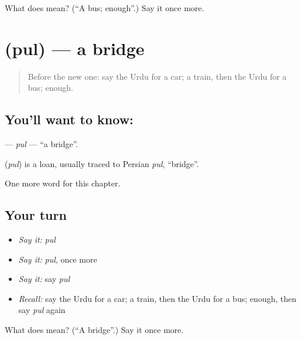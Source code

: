 \begin{tcolorbox}[breakable,colback=teal!4,colframe=teal!35!black,title={Before you move on}]
What does  mean? (\textquotedblleft{}A bus; enough\textquotedblright{}.) Say it once more.
\end{tcolorbox}
\section[\texorpdfstring{\ur{پل} (pul)}{پل (pul)}]{ (pul) — a bridge}

\label{lesson:UR-C80-pul}



\begin{quote}
Before the new one: say the Urdu for a car; a train, then the Urdu for a bus; enough.
\end{quote}

\subsection*{You'll want to know: }
\textbf{} — \emph{pul} — \textquotedblleft{}a bridge\textquotedblright{}.

\begin{cousinweb}
\textbf{} (\emph{pul}) is a loan, usually traced to Persian \emph{pul}, \textquotedblleft{}bridge\textquotedblright{}.
\end{cousinweb}

\begin{grammarlens}[title={What you've built}]
One more word for this chapter.
\end{grammarlens}

\subsection*{Your turn}
\begin{itemize}
\raggedright
  \item \emph{Say it:} \emph{pul}
  \item \emph{Say it:} \emph{pul}, once more
  \item \emph{Say it:} say \emph{pul}
  \item \emph{Recall:} say the Urdu for a car; a train, then the Urdu for a bus; enough, then say \emph{pul} again
\end{itemize}

\begin{tcolorbox}[breakable,colback=teal!4,colframe=teal!35!black,title={Before you move on}]
What does  mean? (\textquotedblleft{}A bridge\textquotedblright{}.) Say it once more.
\end{tcolorbox}
